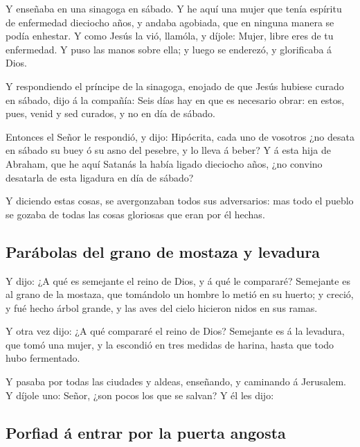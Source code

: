  Y enseñaba en una sinagoga en sábado.  Y
he aquí una mujer que tenía espíritu de enfermedad dieciocho años, y
andaba agobiada, que en ninguna manera se podía enhestar.
 Y como Jesús la vió, llamóla, y díjole: Mujer, libre
eres de tu enfermedad.  Y puso las manos sobre ella; y
luego se enderezó, y glorificaba á Dios.

 Y respondiendo el príncipe de la sinagoga, enojado de
que Jesús hubiese curado en sábado, dijo á la compañía: Seis días hay en
que es necesario obrar: en estos, pues, venid y sed curados, y no en día
de sábado.

 Entonces el Señor le respondió, y dijo: Hipócrita, cada
uno de vosotros ¿no desata en sábado su buey ó su asno del pesebre, y lo
lleva á beber?  Y á esta hija de Abraham, que he aquí
Satanás la había ligado dieciocho años, ¿no convino desatarla de esta
ligadura en día de sábado?

 Y diciendo estas cosas, se avergonzaban todos sus
adversarios: mas todo el pueblo se gozaba de todas las cosas gloriosas
que eran por él hechas.

\hypertarget{paruxe1bolas-del-grano-de-mostaza-y-levadura}{%
\subsection{Parábolas del grano de mostaza y
levadura}\label{paruxe1bolas-del-grano-de-mostaza-y-levadura}}

 Y dijo: ¿A qué es semejante el reino de Dios, y á qué le
compararé?  Semejante es al grano de la mostaza, que
tomándolo un hombre lo metió en su huerto; y creció, y fué hecho árbol
grande, y las aves del cielo hicieron nidos en sus ramas.

 Y otra vez dijo: ¿A qué compararé el reino de Dios?
 Semejante es á la levadura, que tomó una mujer, y la
escondió en tres medidas de harina, hasta que todo hubo fermentado.

 Y pasaba por todas las ciudades y aldeas, enseñando, y
caminando á Jerusalem.  Y díjole uno: Señor, ¿son pocos
los que se salvan? Y él les dijo:

\hypertarget{porfiad-uxe1-entrar-por-la-puerta-angosta}{%
\subsection{Porfiad á entrar por la puerta
angosta}\label{porfiad-uxe1-entrar-por-la-puerta-angosta}}

